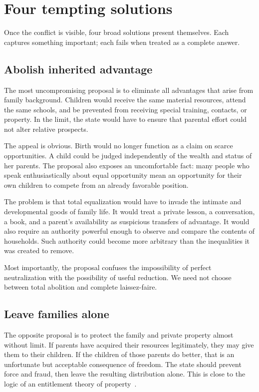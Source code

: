 ﻿\documentclass[12pt,a4paper]{book}
\begin{document}
\section{Four tempting solutions}

Once the conflict is visible, four broad solutions present themselves.  Each
captures something important; each fails when treated as a complete answer.

\subsection{Abolish inherited advantage}

The most uncompromising proposal is to eliminate all advantages that arise
from family background.  Children would receive the same material
resources, attend the same schools, and be prevented from receiving special
training, contacts, or property.  In the limit, the state would have to
ensure that parental effort could not alter relative prospects.

The appeal is obvious.  Birth would no longer function as a claim on scarce
opportunities.  A child could be judged independently of the wealth and
status of her parents.  The proposal also exposes an uncomfortable fact:
many people who speak enthusiastically about equal opportunity mean an
opportunity for their own children to compete from an already favorable
position.

The problem is that total equalization would have to invade the intimate
and developmental goods of family life.  It would treat a private lesson,
a conversation, a book, and a parent’s availability as suspicious transfers
of advantage.  It would also require an authority powerful enough to
observe and compare the contents of households.  Such authority could
become more arbitrary than the inequalities it was created to remove.

Most importantly, the proposal confuses the impossibility of perfect
neutralization with the possibility of useful reduction.  We need not choose
between total abolition and complete laissez-faire.

\subsection{Leave families alone}

The opposite proposal is to protect the family and private property almost
without limit.  If parents have acquired their resources legitimately, they
may give them to their children.  If the children of those parents do better,
that is an unfortunate but acceptable consequence of freedom.  The state
should prevent force and fraud, then leave the resulting distribution alone.
This is close to the logic of an entitlement theory of property~\cite{Nozick1974}.
\end{document}
